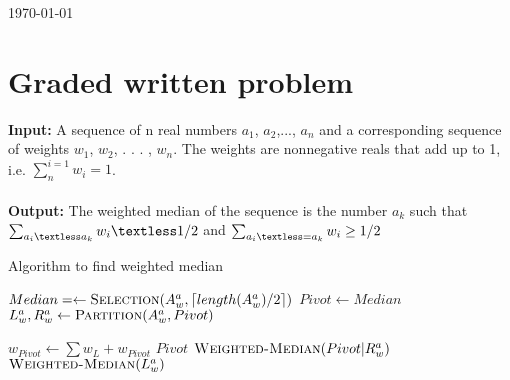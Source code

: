 \documentclass[8pt]{article}
\DeclarePairedDelimiter\ceil{\lceil}{\rceil}
\begin{document}
\hfill \small{\today} \\
\setlength{\fboxrule}{.5mm}\setlength{\fboxsep}{1.2mm}
\newlength{\boxlength}\setlength{\boxlength}{\textwidth}
\addtolength{\boxlength}{-4mm}
\begin{center}\end{center}
\vspace{5mm}

\section{Graded written problem}

\textbf{Input:} A sequence of n real numbers $a_1$, $a_2$,..., $a_n$ and a corresponding sequence of weights $w_1$, $w_2$, . . . , $w_n$. The weights are nonnegative reals that add up to 1, i.e. $\sum_n^{i=1} w_i = 1$. \\
\\
\textbf{Output:} The weighted median of the sequence is the number $a_k$ such that
$\sum_{a_i \textless a_k} w_i \textless 1/2$ and $\sum_{a_i \textless= a_k} w_i \geq 1/2$

\begin{algorithm}
\caption{Algorithm to find weighted median}\label{euclid}
\begin{algorithmic}[1]

    \State {} 
\EndIf

\State $Median = \leftarrow \Call{Selection}{A_w^a, \ceil{length(A_w^a)/2}}$ 
    \State $Pivot \leftarrow Median$
    \State $L_{w}^{a},R_{w}^{a} \leftarrow \Call{Partition}{A_w^a, Pivot}$

        \State $w_{Pivot} \leftarrow \sum w_L + w_{Pivot}$
            \State \Return ${Pivot}$
        \EndIf
        \State $\Call{Weighted-Median}{Pivot|R_w^a}$
    \Else
        \State $\Call{Weighted-Median}{L_w^a}$
    \EndIf

\EndProcedure
\end{algorithmic}
\end{algorithm}
\end{document}
